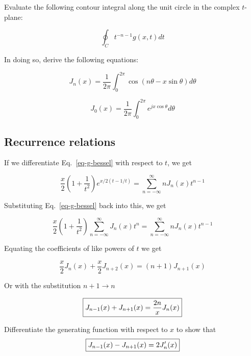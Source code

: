 \begin{sidebar}
\begin{ex}
Evaluate the following contour integral along the unit circle in the complex $t$-plane:

$$ \oint_C t^{-n-1} g(x,t) dt $$

In doing so, derive the following equations:

$$J_n(x) = \frac {1}{2\pi} \int_0 ^ {2 \pi} \cos (n \theta - x \sin \theta ) d\theta $$

$$ J_0(x) =  \frac {1}{2\pi} \int_0 ^ {2 \pi}  e^{j x \cos \theta} d \theta $$
\end{ex}
\end{sidebar}


\subsection{Recurrence relations}

If we differentiate Eq.~\ref{eq-g-bessel} with respect to $t$, we get

\begin{equation}
\frac{x}{2}\left({1 + \frac{1}{t^2}}\right) e^{x/2(t-1/t)} = \sum_{n = - \infty}^{\infty} n J_n(x)t^{n-1}
\end{equation}

Substituting Eq.~\ref{eq-g-bessel} back into this, we get


\begin{equation}
\frac{x}{2}\left({1 + \frac{1}{t^2}}\right) \sum_{n = - \infty}^{\infty} J_n(x)t^n = \sum_{n = - \infty}^{\infty} n J_n(x)t^{n-1}
\end{equation} 

Equating the coefficients of like powers of $t$ we get

\begin{equation}
\frac{x}{2} J_n(x) + \frac{x}{2} J_{n+2}(x) = (n+1)J_{n+1}(x)
\end{equation} 

Or with the substitution $n+1 \to n$

\begin{equation}
\fbox{$\displaystyle
J_{n-1}(x) + J_{n+1}(x) = \frac{2n}{x} J_n(x)
$}
\end{equation} 

\begin{sidebar}
\begin{ex}
Differentiate the generating function with respect to $x$ to show that
$$\fbox{$\displaystyle J_{n-1}(x) - J_{n+1}(x) = 2 J_n'(x)$}$$ \label{ex-recur}
\end{ex}
\end{sidebar}

